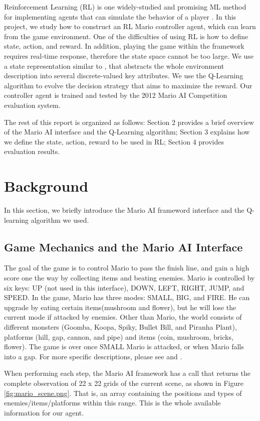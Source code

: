 Reinforcement Learning (RL) \cite{sutton1998reinforcement} is one widely-studied and promising ML method for implementing agents that can simulate the behavior of a player \cite{tsay2011evolving}. In this project, we study how to construct an RL Mario controller agent, which can learn from the game environment. One of the difficulties of using RL is how to define state, action, and reward. In addition, playing the game within the framework requires real-time response, therefore the state space cannot be too large. We use a state representation similar to \cite{tsay2011evolving}, that abstracts the whole environment description into several discrete-valued key attributes. We use the Q-Learning algorithm to evolve the decision strategy that aims to maximize the reward. Our controller agent is trained and tested by the 2012 Mario AI Competition evaluation system. 

The rest of this report is organized as follows: Section 2 provides a brief overview of the Mario AI interface and the Q-Learning algorithm; Section 3 explains how we define the state, action, reward to be used in RL; Section 4 provides evaluation results.

\section{Background}
In this section, we briefly introduce the Mario AI frameword interface and the Q-learning algorithm we used.

\subsection{Game Mechanics and the Mario AI Interface}
The goal of the game is to control Mario to pass the finish line, and gain a high score one the way by collecting items and beating enemies. Mario is controlled by six keys: UP (not used in this interface), DOWN, LEFT, RIGHT, JUMP, and SPEED. In the game, Mario has three modes: SMALL, BIG, and FIRE. He can upgrade by eating certain items(mushroom and flower), but he will lose the current mode if attacked by enemies. Other than Mario, the world consists of different monsters (Goomba, Koopa, Spiky, Bullet Bill, and Piranha Plant), platforms (hill, gap, cannon, and pipe) and items (coin, mushroom, bricks, flower). The game is over once SMALL Mario is attacked, or when Mario falls into a gap. For more specific descriptions, please see \cite{tsay2011evolving} and \cite{togelius20102009}.

When performing each step, the Mario AI framework has a call that returns the complete observation of 22 x 22 grids of the current scene, as shown in Figure \ref{fig:mario_scene.png}. That is, an array containing the positions and types of enemies/items/platforms within this range. This is the whole available information for our agent.

